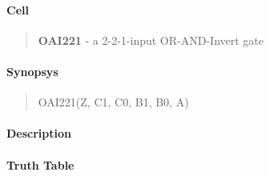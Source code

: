 \label{OAI221}
\paragraph{Cell}
\begin{quote}
    \textbf{OAI221} - a 2-2-1-input OR-AND-Invert gate
\end{quote}

\paragraph{Synopsys}
\begin{quote}
    OAI221(Z, C1, C0, B1, B0, A)
\end{quote}

\paragraph{Description}



\paragraph{Truth Table}


